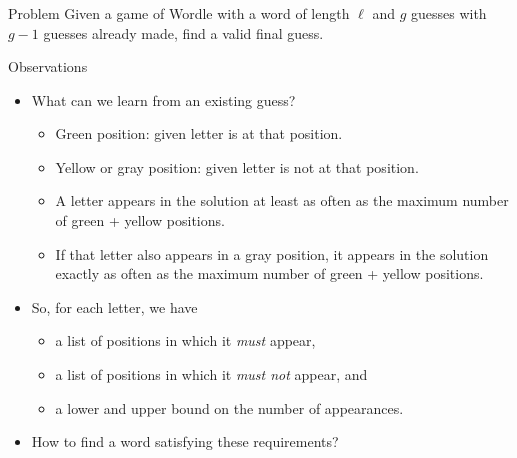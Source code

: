 \begin{frame}
    \frametitle{\problemtitle}

    \begin{block}{Problem}
        Given a game of Wordle with a word of length $\ell$
        and $g$ guesses with $g-1$ guesses already made,
        find a valid final guess.
    \end{block}
    \pause

    \begin{block}{Observations}
        \begin{itemize}
            \item<+-> What can we learn from an existing guess?
            \begin{itemize}
                \item<+-> Green position: given letter is at that position.
                \item<+-> Yellow or gray position: given letter is not at that position.
                \item<+-> A letter appears in the solution at least as often as
                    the maximum number of green + yellow positions.
                \item<+-> If that letter also appears in a gray position, it
                    appears in the solution exactly as often as the maximum number of green + yellow positions.
            \end{itemize}
            \item<+-> So, for each letter, we have
            \begin{itemize}
                \item a list of positions in which it \emph{must} appear,
                \item a list of positions in which it \emph{must not} appear, and
                \item a lower and upper bound on the number of appearances.
            \end{itemize}
            \item<+-> How to find a word satisfying these requirements?
        \end{itemize}
    \end{block}
\end{frame}

